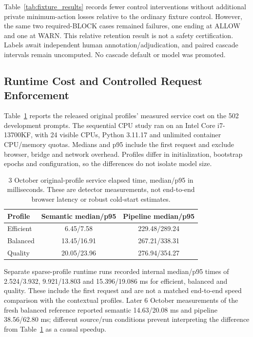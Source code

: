 \documentclass[conference]{IEEEtran}
\begin{document}
Table~\ref{tab:fixture_results} records fewer control interventions without additional private minimum-action losses relative to the ordinary fixture control. However, the same two required-BLOCK cases remained failures, one ending at ALLOW and one at WARN. This relative retention result is not a safety certification. Labels await independent human annotation/adjudication, and paired cascade intervals remain uncomputed. No cascade default or model was promoted.

\subsection{Runtime Cost and Controlled Request Enforcement}

Table~\ref{tab:runtime_cost} reports the released original profiles' measured service cost on the 502 development prompts. The sequential CPU study ran on an Intel Core i7-13700KF, with 24 visible CPUs, Python 3.11.17 and unlimited container CPU/memory quotas. Medians and p95 include the first request and exclude browser, bridge and network overhead. Profiles differ in initialization, bootstrap epochs and configuration, so the differences do not isolate model size.

\begin{table}[t]
\centering
\caption{3 October original-profile service elapsed time, median/p95 in milliseconds. These are detector measurements, not end-to-end browser latency or robust cold-start estimates.}
\label{tab:runtime_cost}
\small
\setlength{\tabcolsep}{5pt}
\begin{tabular}{lcc}
\hline
Profile & Semantic median/p95 & Pipeline median/p95 \\
\hline
Efficient & 6.45/7.58 & 229.48/289.24 \\
Balanced & 13.45/16.91 & 267.21/338.31 \\
Quality & 20.05/23.96 & 276.94/354.27 \\
\hline
\end{tabular}
\end{table}

Separate sparse-profile runtime runs recorded internal median/p95 times of 2.524/3.932, 9.921/13.803 and 15.396/19.086 ms for efficient, balanced and quality. These include the first request and are not a matched end-to-end speed comparison with the contextual profiles. Later 6 October measurements of the fresh balanced reference reported semantic 14.63/20.08 ms and pipeline 38.56/62.80 ms; different source/run conditions prevent interpreting the difference from Table~\ref{tab:runtime_cost} as a causal speedup.
\end{document}
